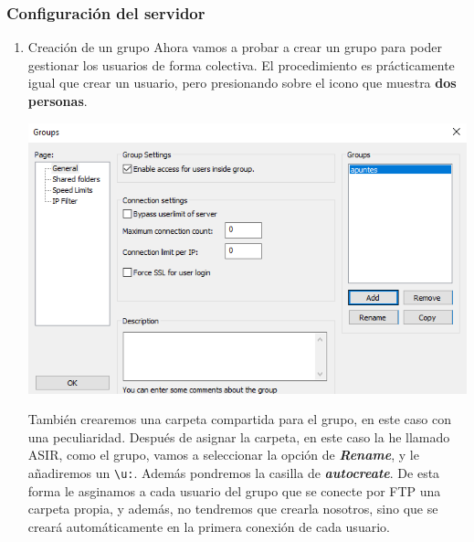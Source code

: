 \documentclass[11pt]{article}
\begin{document}
\subsubsection{Configuración del servidor}
\label{sec:org8eb50db}
\begin{enumerate}
\item Creación de un grupo
\label{sec:orgd8bbdba}
Ahora vamos a probar a crear un grupo para poder gestionar los usuarios de forma colectiva. El procedimiento es prácticamente igual que crear un usuario, pero presionando sobre el icono que
muestra \textbf{dos personas}.

\begin{center}
\includegraphics[width=.9\linewidth]{./media/6.png}
\end{center}

También crearemos una carpeta compartida para el grupo, en este caso con una peculiaridad. Después de asignar la carpeta, en este caso la he llamado ASIR, como el grupo, vamos a seleccionar
la opción de \textbf{\emph{Rename}}, y le añadiremos un \texttt{\textbackslash{}u:}. Además pondremos la casilla de \textbf{\emph{autocreate}}. De esta forma le asginamos a cada usuario del grupo que se conecte por FTP una carpeta propia,
y además, no tendremos que crearla nosotros, sino que se creará automáticamente en la primera conexión de cada usuario.


\end{enumerate}
\end{document}
